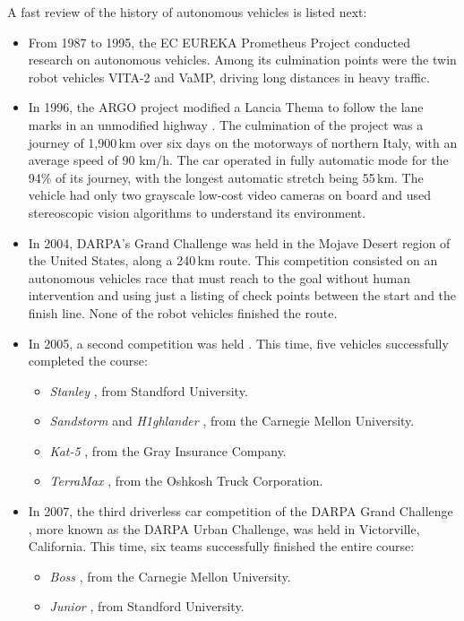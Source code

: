 A fast review of the history of autonomous vehicles is listed next:
\begin{itemize}
\item From 1987 to 1995, the EC EUREKA Prometheus Project conducted research on autonomous vehicles. Among its culmination points were the twin robot vehicles VITA-2 and VaMP, driving long distances in heavy traffic.
\item In 1996, the ARGO project modified a Lancia Thema to follow the lane marks in an unmodified highway \citep{Broggi1999}. The culmination of the project was a journey of 1,900\,km over six days on the motorways of northern Italy, with an average speed of 90 km/h. The car operated in fully automatic mode for the 94\% of its journey, with the longest automatic stretch being 55\,km. The vehicle had only two grayscale low-cost video cameras on board and used stereoscopic vision algorithms to understand its environment. 
 \item In 2004, DARPA's Grand Challenge was held in the Mojave Desert region of the United States, along a 240\,km route. This competition consisted on an autonomous vehicles race that must reach to the goal without human intervention and using just a listing of check points between the start and the finish line. None of the robot vehicles finished the route.
 \item In 2005, a second competition was held \citep{Buehler2007}. This time, five vehicles successfully completed the course:
 \begin{itemize}
  \item \emph{Stanley} \citep{thrun2006stanley}, from Standford University.
  \item \emph{Sandstorm} and \emph{H1ghlander} \citep{urmson2004high}, from the Carnegie Mellon University.
  \item \emph{Kat-5} \citep{trepagnier2006kat}, from the Gray Insurance Company.
  \item \emph{TerraMax} \citep{ozguner2004team}, from the Oshkosh Truck Corporation.
 \end{itemize}
 \item In 2007, the third driverless car competition of the DARPA Grand Challenge \citep{Buehler2009}, more known as the DARPA Urban Challenge, was held in Victorville, California. This time, six teams successfully finished the entire course:
 \begin{itemize}
  \item \emph{Boss} \citep{Urmson2008}, from the Carnegie Mellon University.
  \item \emph{Junior} \citep{Montemerlo2008}, from Standford University.

\end{itemize}
\end{itemize}

